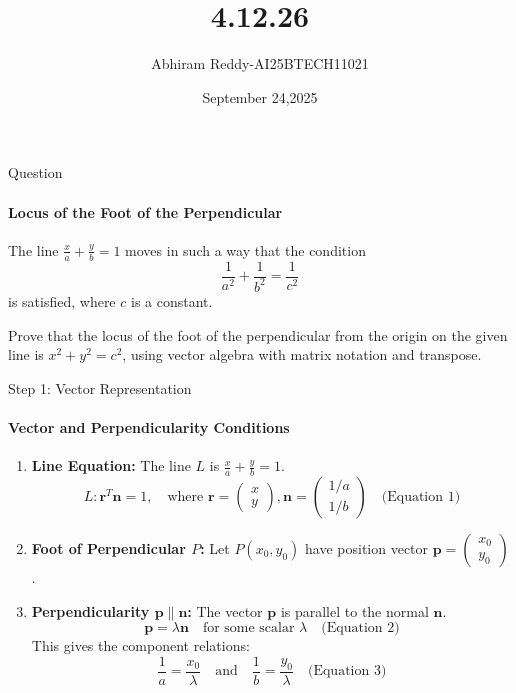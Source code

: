 \documentclass{beamer}
\title 
{4.12.26}
\date{September 24,2025}
\author 
{Abhiram Reddy-AI25BTECH11021}
\begin{document}
\frame{\titlepage}

\begin{frame}{Question}
    \framesubtitle{Locus of the Foot of the Perpendicular}
    
    The line $\frac{x}{a} + \frac{y}{b} = 1$ moves in such a way that the condition
    $$\frac{1}{a^2} + \frac{1}{b^2} = \frac{1}{c^2}$$
    is satisfied, where $c$ is a constant.
    
    Prove that the locus of the foot of the perpendicular from the origin on the given line is $x^2 + y^2 = c^2$, using vector algebra with matrix notation and transpose.
\end{frame}

\begin{frame}{Step 1: Vector Representation}
    \framesubtitle{Vector and Perpendicularity Conditions}
    
    \begin{enumerate}
        \item \textbf{Line Equation:} The line $L$ is $\frac{x}{a} + \frac{y}{b} = 1$.
        $$L: \mathbf{r}^T \mathbf{n} = 1, \quad \text{where } \mathbf{r} = \begin{pmatrix} x \\ y \end{pmatrix}, \mathbf{n} = \begin{pmatrix} 1/a \\ 1/b \end{pmatrix} \quad \text{(Equation 1)}$$
        
        \item \textbf{Foot of Perpendicular $P$:} Let $P(x_0, y_0)$ have position vector $\mathbf{p} = \begin{pmatrix} x_0 \\ y_0 \end{pmatrix}$.
        
        \item \textbf{Perpendicularity $\mathbf{p} \parallel \mathbf{n}$:} The vector $\mathbf{p}$ is parallel to the normal $\mathbf{n}$.
        $$\mathbf{p} = \lambda \mathbf{n} \quad \text{for some scalar } \lambda \quad \text{(Equation 2)}$$
        This gives the component relations:
        $$\frac{1}{a} = \frac{x_0}{\lambda} \quad \text{and} \quad \frac{1}{b} = \frac{y_0}{\lambda} \quad \text{(Equation 3)}$$
    \end{enumerate}
\end{frame}
\end{document}
